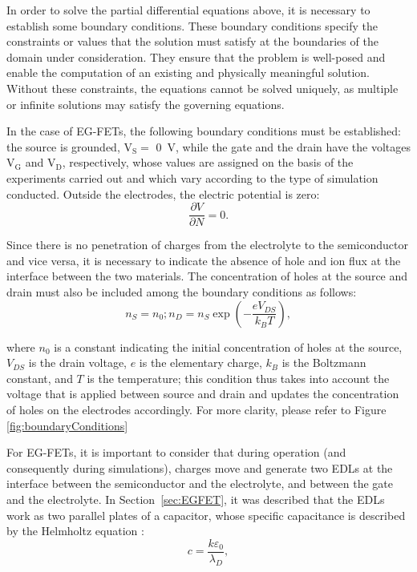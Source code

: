 In order to solve the partial differential equations above, it is necessary to establish some boundary conditions. These boundary conditions specify the constraints or values that the solution must satisfy at the boundaries of the domain under consideration. They ensure that the problem is well-posed and enable the computation of an existing and physically meaningful solution. Without these constraints, the equations cannot be solved uniquely, as multiple or infinite solutions may satisfy the governing equations.

In the case of EG-FETs, the following boundary conditions must be established: the source is grounded, \ie{} $\mathrm{V_S} =$ \SI{0}{V}, while the gate and the drain have the voltages $\mathrm{V_G}$ and $\mathrm{V_D}$, respectively, whose values are assigned on the basis of the experiments carried out and which vary according to the type of simulation conducted. Outside the electrodes, the electric potential is zero:
%
\begin{displaymath}
    \dfrac{\partial V}{\partial N} = 0.
\end{displaymath}

Since there is no penetration of charges from the electrolyte to the semiconductor and vice versa, it is necessary to indicate the absence of hole and ion flux at the interface between the two materials. The concentration of holes at the source and drain must also be included among the boundary conditions as follows:
%
\begin{equation}
    n_S = n_0; n_D = n_S \exp\left(-\dfrac{eV_{DS}}{k_BT}\right),
\end{equation}

where $n_0$ is a constant indicating the initial concentration of holes at the source, $V_{DS}$ is the drain voltage, $e$ is the elementary charge, $k_B$ is the Boltzmann constant, and $T$ is the temperature; this condition thus takes into account the voltage that is applied between source and drain and updates the concentration of holes on the electrodes accordingly. For more clarity, please refer to Figure \ref{fig:boundaryConditions}

For EG-FETs, it is important to consider that during operation (and consequently during simulations), charges move and generate two EDLs at the interface between the semiconductor and the electrolyte, and between the gate and the electrolyte. In Section~\ref{sec:EGFET}, it was described that the EDLs work as two parallel plates of a capacitor, whose specific capacitance is described by the Helmholtz equation \citep{kimElectrolyteGated2013}:
%
\begin{equation}
    c = \dfrac{k\varepsilon_0}{\lambda_D},
\end{equation}

